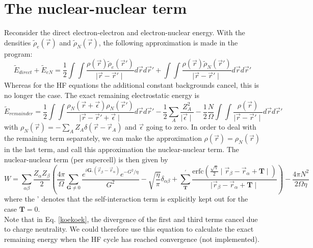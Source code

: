 \documentclass[11pt,a4paper]{article}
\begin{document}
\section{The nuclear-nuclear term}
Reconsider the direct electron-electron and electron-nuclear energy. With the densities $\tilde{\rho}_e(\vec{r})$ and $\tilde{\rho}_N(\vec{r})$, the following approximation is made in the program:
\begin{equation}
\tilde{E}_{direct} + \tilde{E}_{eN} = \frac{1}{2} \int \int \frac{\rho(\vec{r}) \tilde{\rho}_e(\vec{r}')}{\mid \vec{r} - \vec{r}' \mid} d\vec{r} d\vec{r}' + \int \int \frac{\rho(\vec{r}) \tilde{\rho}_N(\vec{r}')}{\mid \vec{r} - \vec{r}' \mid} d\vec{r} d\vec{r}'
\end{equation}
Whereas for the HF equations the additional constant backgrounds cancel, this is no longer the case. The exact remaining electrostatic energy is 
\begin{equation}
\tilde{E}_{remainder} = \frac{1}{2} \int \int \frac{\rho_N(\vec{r} + \vec{\epsilon}) \rho_N(\vec{r}')}{\mid \vec{r} - \vec{r}' + \vec{\epsilon} \mid} d\vec{r} d\vec{r}' - \frac{1}{2} \sum\limits_A \frac{Z_A^2}{\mid \vec{\epsilon} \mid} - \frac{1}{2} \frac{N}{\Omega} \int \int \frac{\rho(\vec{r})}{\mid \vec{r} - \vec{r}' \mid} d\vec{r} d\vec{r}' \label{koekoek}
\end{equation}
with $\rho_N(\vec{r}) = - \sum\limits_A Z_A \delta(\vec{r} - \vec{r}_A)$ and $\vec{\epsilon}$ going to zero. In order to deal with the remaining term separately, we can make the approximation $\rho(\vec{r}) = \rho_N(\vec{r})$ in the last term, and call this approximation the nuclear-nuclear term. The nuclear-nuclear term (per supercell) is then given by
\begin{equation}
W = \sum\limits_{\alpha\beta} \frac{Z_{\alpha}Z_{\beta}}{2} \left( \frac{4\pi}{\Omega} \sum\limits_{\mathbf{G} \neq 0} \frac{e^{i \mathbf{G}.(\vec{r}_{\beta} - \vec{r}_{\alpha})} e^{-G^2/\eta}}{G^2} - \sqrt{\frac{\eta}{\pi}} \delta_{\alpha\beta} + \sum\limits_{\mathbf{T}}^{'} \frac{\text{erfc}\left( \frac{\sqrt{\eta}}{2} \mid \vec{r}_{\beta} - \vec{r}_{\alpha} + \mathbf{T} \mid \right)}{\mid \vec{r}_{\beta} - \vec{r}_{\alpha} + \mathbf{T} \mid}  \right) - \frac{4 \pi N^2}{2 \Omega \eta} \label{gjgj3}
\end{equation}
where the ' denotes that the self-interaction term is explicitly kept out for the case $\mathbf{T} = 0$.\\

Note that in Eq. \eqref{koekoek}, the divergence of the first and third terms cancel due to charge neutrality. We could therefore use this equation to calculate the exact remaining energy when the HF cycle has reached convergence (not implemented).
\end{document}
